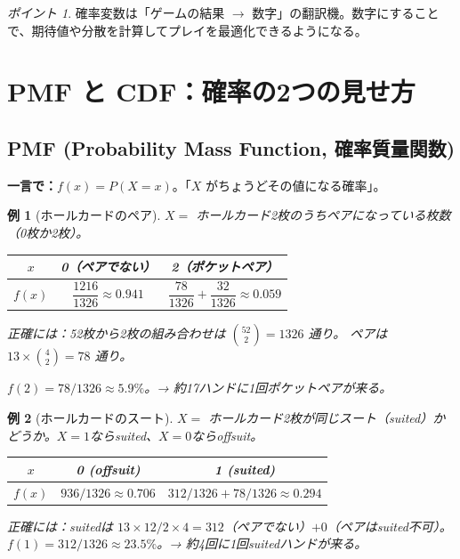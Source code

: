 \documentclass{article}
\newtheorem{example}{例}[section]
\theoremstyle{remark}
\newtheorem*{point}{ポイント}
\begin{document}
\begin{point}
  確率変数は「ゲームの結果 $\to$ 数字」の翻訳機。数字にすることで、期待値や分散を計算してプレイを最適化できるようになる。
\end{point}

\section{PMF と CDF：確率の2つの見せ方}

\subsection{PMF (Probability Mass Function, 確率質量関数)}

\textbf{一言で：}$f(x) = P(X = x)$。「$X$ がちょうどその値になる確率」。

\begin{example}[ホールカードのペア]
  $X =$ ホールカード2枚のうちペアになっている枚数（0枚か2枚）。
  \begin{center}
    \begin{tabular}{c|cc}
      $x$ & 0（ペアでない） & 2（ポケットペア） \\ \hline
      $f(x)$ & $\dfrac{1216}{1326} \approx 0.941$ & $\dfrac{78}{1326} + \dfrac{32}{1326} \approx 0.059$
    \end{tabular}
  \end{center}

  正確には：52枚から2枚の組み合わせは $\binom{52}{2} = 1326$ 通り。
  ペアは $13 \times \binom{4}{2} = 78$ 通り。

  $f(2) = 78/1326 \approx 5.9\%$。→ 約17ハンドに1回ポケットペアが来る。
\end{example}

\begin{example}[ホールカードのスート]
  $X =$ ホールカード2枚が同じスート（suited）かどうか。$X = 1$ならsuited、$X = 0$ならoffsuit。
  \begin{center}
    \begin{tabular}{c|cc}
      $x$ & 0 (offsuit) & 1 (suited) \\ \hline
      $f(x)$ & $936/1326 \approx 0.706$ & $312/1326 + 78/1326 \approx 0.294$
    \end{tabular}
  \end{center}

  正確には：suitedは $13 \times 12 / 2 \times 4 = 312$（ペアでない）$+ 0$（ペアはsuited不可）。
  $f(1) = 312/1326 \approx 23.5\%$。→ 約4回に1回suitedハンドが来る。
\end{example}
\end{document}
